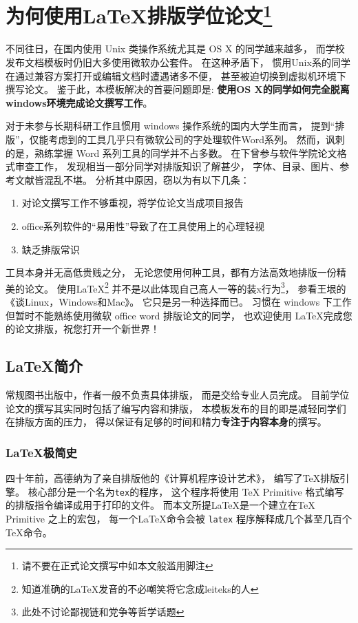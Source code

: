 
\chapter{为何使用\LaTeX 排版学位论文\footnote{请不要在正式论文撰写中如本文般滥用脚注}}
不同往日，在国内使用 Unix 类操作系统尤其是 OS X 的同学越来越多，
而学校发布文档模板时仍旧大多使用微软办公套件。
在这种矛盾下，
惯用Unix系的同学在通过兼容方案打开或编辑文档时遭遇诸多不便，
甚至被迫切换到虚拟机环境下撰写论文。
鉴于此，本模板解决的首要问题即是:
\textbf{使用OS X的同学如何完全脱离windows环境完成论文撰写工作}。

对于未参与长期科研工作且惯用 windows 操作系统的国内大学生而言，
提到“排版”，仅能考虑到的工具几乎只有微软公司的字处理软件Word系列。
然而，讽刺的是，熟练掌握 Word 系列工具的同学并不占多数。
在下曾参与软件学院论文格式审查工作，
发现相当一部分同学对排版知识了解甚少，
字体、目录、图片、参考文献皆混乱不堪。
分析其中原因，窃以为有以下几条：
\begin{enumerate}
    \item 对论文撰写工作不够重视，将学位论文当成项目报告
    \item office系列软件的“易用性”导致了在工具使用上的心理轻视
    \item 缺乏排版常识
\end{enumerate}

工具本身并无高低贵贱之分，
无论您使用何种工具，都有方法高效地排版一份精美的论文。
使用\LaTeX \footnote{知道准确的\LaTeX 发音的不必嘲笑将它念成leiteks的人}
并不是以此体现自己高人一等的装x行为\footnote{此处不讨论鄙视链和党争等哲学话题}，
参看王垠的《谈Linux，Windows和Mac》\cite{yinwang2013}。
它只是另一种选择而已。
习惯在 windows 下工作但暂时不能熟练使用微软 office word 排版论文的同学，
也欢迎使用 \LaTeX 完成您的论文排版，祝您打开一个新世界！

\section{\LaTeX  简介}
常规图书出版中，作者一般不负责具体排版，
而是交给专业人员完成。
目前学位论文的撰写其实同时包括了编写内容和排版，
本模板发布的目的即是减轻同学们在排版方面的压力，
得以保证有足够的时间和精力\textbf{专注于内容本身}的撰写。

\subsection{\LaTeX 极简史}
四十年前，高德纳为了亲自排版他的《计算机程序设计艺术》，
编写了\TeX 排版引擎。
核心部分是一个名为\texttt{tex}的程序，
这个程序将使用 TeX Primitive 格式编写的排版指令编译成用于打印的文件。
而本文所提\LaTeX 是一个建立在TeX Primitive 之上的宏包，
每一个\LaTeX 命令会被 \texttt{latex} 程序解释成几个甚至几百个\TeX 命令。

